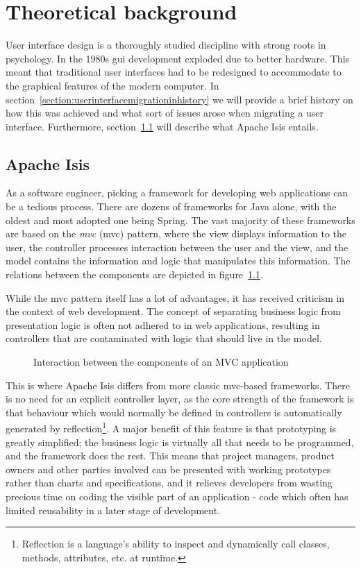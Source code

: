 \chapter{Theoretical background}
\label{chapter:theoreticalbackground}
User interface design is a thoroughly studied discipline with strong roots in psychology. In the 1980s \acrshort{gui} development exploded due to better hardware\cite{myers1998brief}. This meant that traditional user interfaces had to be redesigned to accommodate to the graphical features of the modern computer. In section~\ref{section:userinterfacemigrationinhistory} we will provide a brief history on how this was achieved and what sort of issues arose when migrating a user interface. Furthermore, section~\ref{section:apacheisis} will describe what Apache Isis entails.

\section{Apache Isis}
\label{section:apacheisis}
As a software engineer, picking a framework for developing web applications can be a tedious process. There are dozens of frameworks for Java alone, with the oldest and most adopted one being Spring\cite{Sprin96:online}. The vast majority of these frameworks are based on the \textit{\acrlong{mvc}} (\acrshort{mvc}) pattern, where the view displays information to the user, the controller processes interaction between the user and the view, and the model contains the information and logic that manipulates this information\cite{leff2001web}. The relations between the components are depicted in figure~\ref{figure:mvc}.

While the \acrshort{mvc} pattern itself has a lot of advantages, it has received criticism in the context of web development. The concept of separating business logic from presentation logic is often not adhered to in web applications, resulting in controllers that are contaminated with logic that should live in the model\cite{Fulfi2:online}.

\begin{figure}[h]
	\center
	
	\caption{Interaction between the components of an MVC application}
	\label{figure:mvc}
\end{figure}

This is where Apache Isis differs from more classic \acrshort{mvc}-based frameworks. There is no need for an explicit controller layer, as the core strength of the framework is that behaviour which would normally be defined in controllers is automatically generated by reflection\footnote{Reflection is a language's ability to inspect and dynamically call classes, methods, attributes, etc. at runtime.}. A major benefit of this feature is that prototyping is greatly simplified; the business logic is virtually all that needs to be programmed, and the framework does the rest. This means that project managers, product owners and other parties involved can be presented with working prototypes rather than charts and specifications, and it relieves developers from wasting precious time on coding the visible part of an application - code which often has limited reusability in a later stage of development.

